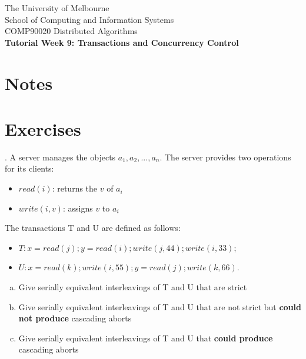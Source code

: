 \documentclass[12pt]{article}
\newcounter{question}
\newcommand{\question}[1]{
    \stepcounter{question}
    \thequestion. #1 \hfill
}
\begin{document}
\begin{center}
    {\sc The University of Melbourne
        \\
        School of Computing and Information Systems
        \\
    COMP90020 Distributed Algorithms}
    \bigskip \\
    {\Large\bf Tutorial Week 9: Transactions and Concurrency Control}
    \bigskip \\
\end{center}

\section*{Notes}

\section*{Exercises}

\setcounter{question}{41}

\question{A server manages the objects $a_1, a_2, ..., a_n$. The server provides two operations for its
clients:}

\begin{itemize}
    \item $read (i)$: returns the $v$ of $a_i$
    \item $write(i, v)$: assigns $v$ to $a_i$
\end{itemize}
The transactions T and U are defined as follows:

\begin{itemize}
    \item $T: x = read(j); y = read (i); write(j, 44); write(i, 33);$
    \item $U: x = read(k); write(i, 55); y = read (j); write(k, 66).$
\end{itemize}


\begin{enumerate}[(a)]
    \item Give serially equivalent interleavings of T and U that are strict
    \item Give serially equivalent interleavings of T and U that are not strict but \textbf{could not produce} cascading aborts
    \item Give serially equivalent interleavings of T and U that \textbf{could produce} cascading aborts
\end{enumerate}
\end{document}
